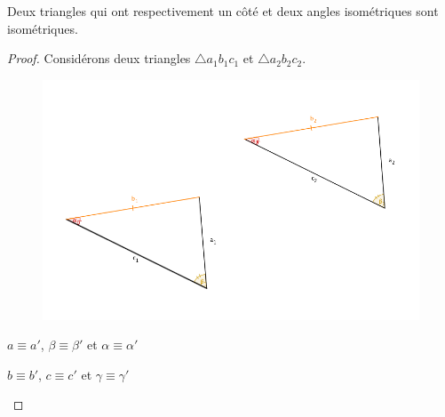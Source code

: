 \documentclass[a4paper,12pt]{article}
\begin{document}
\pagebreak
\begin{corollary}
Deux triangles qui ont respectivement un côté et deux angles isométriques sont isométriques.
\end{corollary}

\begin{proof}
Considérons deux triangles $\triangle a_1b_1c_1$ et $\triangle a_2b_2c_2$.

\begin{figure}[H]
    \centering
    \includegraphics[scale=0.5]{schema/Corrolaire.png}
\end{figure}

\begin{hyp}
$a \equiv a'$, $\beta \equiv \beta'$ et $\alpha \equiv \alpha'$
\end{hyp}
\begin{concl}
$b \equiv b'$, $c \equiv c'$ et  $\gamma \equiv \gamma'$
\end{concl}


\end{proof}
\end{document}
